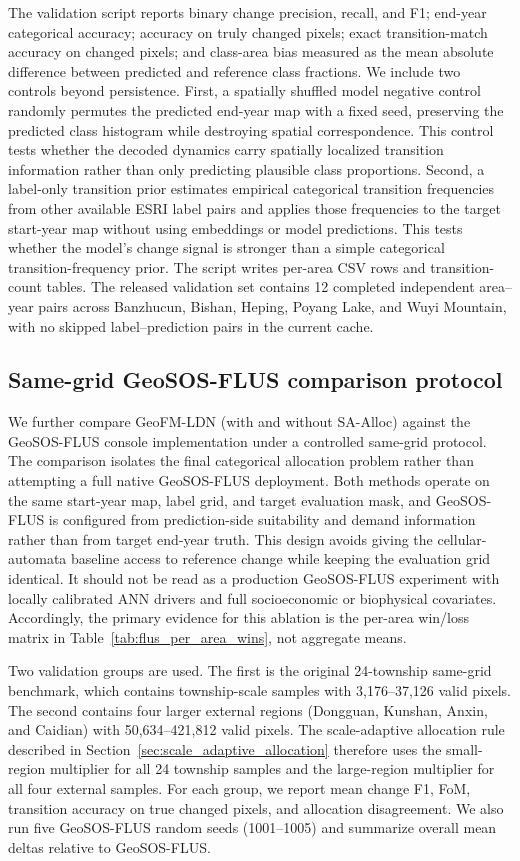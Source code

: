 \documentclass{article}
\begin{document}
The validation script reports binary change precision, recall, and F1; end-year categorical accuracy; accuracy on truly changed pixels; exact transition-match accuracy on changed pixels; and class-area bias measured as the mean absolute difference between predicted and reference class fractions. We include two controls beyond persistence. First, a spatially shuffled model negative control randomly permutes the predicted end-year map with a fixed seed, preserving the predicted class histogram while destroying spatial correspondence. This control tests whether the decoded dynamics carry spatially localized transition information rather than only predicting plausible class proportions. Second, a label-only transition prior estimates empirical categorical transition frequencies from other available ESRI label pairs and applies those frequencies to the target start-year map without using embeddings or model predictions. This tests whether the model's change signal is stronger than a simple categorical transition-frequency prior. The script writes per-area CSV rows and transition-count tables. The released validation set contains 12 completed independent area--year pairs across Banzhucun, Bishan, Heping, Poyang Lake, and Wuyi Mountain, with no skipped label--prediction pairs in the current cache.

\subsection{Same-grid GeoSOS-FLUS comparison protocol}
\label{sec:geosos_flus_protocol}

We further compare GeoFM-LDN (with and without SA-Alloc) against the GeoSOS-FLUS console implementation under a controlled same-grid protocol. The comparison isolates the final categorical allocation problem rather than attempting a full native GeoSOS-FLUS deployment. Both methods operate on the same start-year map, label grid, and target evaluation mask, and GeoSOS-FLUS is configured from prediction-side suitability and demand information rather than from target end-year truth. This design avoids giving the cellular-automata baseline access to reference change while keeping the evaluation grid identical. It should not be read as a production GeoSOS-FLUS experiment with locally calibrated ANN drivers and full socioeconomic or biophysical covariates. Accordingly, the primary evidence for this ablation is the per-area win/loss matrix in Table~\ref{tab:flus_per_area_wins}, not aggregate means.

Two validation groups are used. The first is the original 24-township same-grid benchmark, which contains township-scale samples with 3,176--37,126 valid pixels. The second contains four larger external regions (Dongguan, Kunshan, Anxin, and Caidian) with 50,634--421,812 valid pixels. The scale-adaptive allocation rule described in Section~\ref{sec:scale_adaptive_allocation} therefore uses the small-region multiplier for all 24 township samples and the large-region multiplier for all four external samples. For each group, we report mean change F1, FoM, transition accuracy on true changed pixels, and allocation disagreement. We also run five GeoSOS-FLUS random seeds (1001--1005) and summarize overall mean deltas relative to GeoSOS-FLUS.
\end{document}
